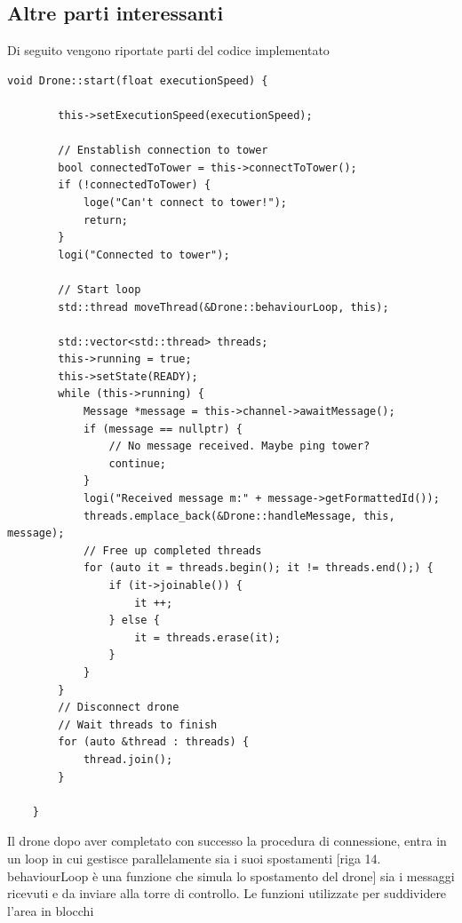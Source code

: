 \documentclass[a4paper, 11pt]{article}
\begin{document}
\subsection{Altre parti interessanti}
Di seguito vengono riportate parti del codice implementato 
\begin{lstlisting}[style=customcpp, caption={da drone.cpp}]
    void Drone::start(float executionSpeed) {

        this->setExecutionSpeed(executionSpeed);

        // Enstablish connection to tower
        bool connectedToTower = this->connectToTower();
        if (!connectedToTower) {
            loge("Can't connect to tower!");
            return;
        }
        logi("Connected to tower");

        // Start loop
        std::thread moveThread(&Drone::behaviourLoop, this);

        std::vector<std::thread> threads;
        this->running = true;
        this->setState(READY);
        while (this->running) {
            Message *message = this->channel->awaitMessage();
            if (message == nullptr) {
                // No message received. Maybe ping tower?
                continue;
            }
            logi("Received message m:" + message->getFormattedId());
            threads.emplace_back(&Drone::handleMessage, this, message);
            // Free up completed threads
            for (auto it = threads.begin(); it != threads.end();) {
                if (it->joinable()) {
                    it ++;
                } else {
                    it = threads.erase(it);
                }
            }
        }
        // Disconnect drone
        // Wait threads to finish
        for (auto &thread : threads) {
            thread.join();
        }

    }
    \end{lstlisting}
    Il drone dopo aver completato con successo la procedura di connessione, entra in un loop in cui gestisce parallelamente sia i suoi spostamenti [riga 14.  behaviourLoop è una funzione che simula lo spostamento del drone] sia i messaggi ricevuti e da inviare alla torre di controllo.
    \newpage
    Le funzioni utilizzate per suddividere l'area in blocchi
\end{document}
